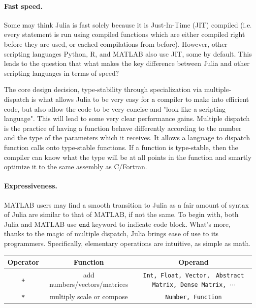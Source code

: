 \paragraph{Fast speed.} Some may think Julia is fast solely because it is Just-In-Time (JIT) compiled (i.e. every statement is run using compiled functions which are either compiled right before they are used, or cached compilations from before). However, other scripting languages Python, R, and MATLAB also use JIT, some by default. This leads to the question that what makes the key difference between Julia and other scripting languages in terms of speed?

The core design decision, type-stability through specialization via multiple-dispatch is what allows Julia to be very easy for a compiler to make into efficient code, but also allow the code to be very concise and "look like a scripting language". This will lead to some very clear performance gains. Multiple dispatch is the practice of having a function behave differently according to the number and the type of the parameters which it receives. It allows a language to dispatch function calls onto type-stable functions. If a function is type-stable, then the compiler can know what the type will be at all points in the function and smartly optimize it to the same assembly as C/Fortran.

\paragraph{Expressiveness.} MATLAB users may find a smooth transition to Julia as a fair amount of syntax of Julia are similar to that of MATLAB, if not the same. To begin with, both Julia and MATLAB use $\texttt{end}$ keyword to indicate code block. What's more, thanks to the magic of multiple dispatch, Julia brings ease of use to its programmers. Specifically, elementary operations are intuitive, as simple as math. 

	  \begin{table}[H]
        \centering
        \begin{tabular}{|| c | c | c ||} 
         \hline
         Operator & Function & Operand \\ [0.5ex] 
         \hline\hline
         \texttt{+} & add numbers/vectors/matrices & \makecell{\texttt{Int, Float, Vector, }\\ \texttt{Abstract Matrix, Dense Matrix, $\cdots$}} \\ \hline
         \texttt{*} & multiply scale or compose & \texttt{Number, Function} \\
         \hline\hline
        \end{tabular}
        \label{add-mul}
      \end{table}
        

